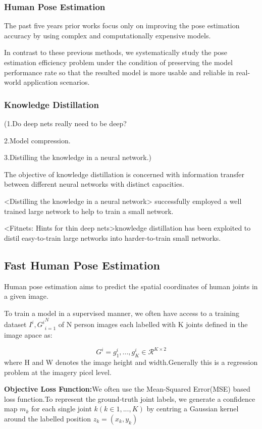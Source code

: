 \documentclass[11pt]{article}
\begin{document}
\subsubsection{Human Pose Estimation}
The past five years prior works focus only on improving the pose estimation accuracy by using complex and computationally expensive models.

In contrast to these previous methods, we systematically study the pose estimation efficiency problem under the condition of preserving the model performance rate so that the resulted model is more usable and reliable in real-world application scenarios.

\subsubsection{Knowledge Distillation}
\noindent(1.Do deep nets really need to be deep?

\noindent2.Model compression.

\noindent3.Distilling the knowledge in a neural network.)

The objective of knowledge distillation is concerned with information transfer between
different neural networks with distinct capacities.

<Distilling the knowledge in a neural network> successfully employed a well trained large network to help to train a small network.

<Fitnets: Hints for thin deep nets>knowledge distillation has been exploited to distil easy-to-train large networks into harder-to-train small networks.

\subsection{Fast Human Pose Estimation}
Human pose estimation aims to predict the spatial coordinates of human joints in a given image.

To train a model in a supervised manner, we often have access to a training dataset ${I^i,G^i}^N_{i=1}$ of N person images each labelled with K joints defined in the image apace as:

$$G^i = {g_1^i,...,g_K^i}\in \mathcal{R}^{K\times 2}$$
where H and W denotes the image height and width.Generally this is a regression problem at the imagery picel level.

\textbf{Objective Loss Function:}We often use the Mean-Squared Error(MSE) based loss function.To represent the ground-truth joint labels, we generate a confidence map $m_k$ for each single joint $k (k\in {1,...,K})$ by centring a Gaussian kernel around the labelled position $z_k = (x_k, y_k)$
\end{document}
